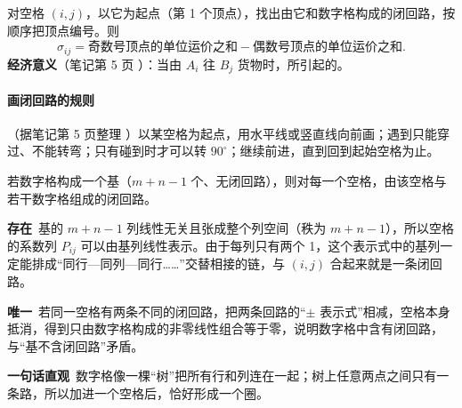 \begin{definitionbox}
对空格 $(i,j)$，以它为起点（第 1 个顶点），找出由它和数字格构成的闭回路，按顺序把顶点编号。则
\[
\sigma_{ij}=\text{奇数号顶点的单位运价之和}-\text{偶数号顶点的单位运价之和}.
\]
\textbf{经济意义}（笔记第 5 页 \orig）：当由 $A_i$ 往 $B_j$ 货物时，所引起的。
\end{definitionbox}

\paragraph{画闭回路的规则}（据笔记第 5 页整理 \orig）以某空格为起点，用水平线或竖直线向前画；遇到只能穿过、不能转弯；只有碰到时才可以转 $90^\circ$；继续前进，直到回到起始空格为止。

\begin{theorembox}[闭回路的存在唯一性]
若数字格构成一个基（$m+n-1$ 个、无闭回路），则对每一个空格，由该空格与若干数字格组成的闭回路。
\end{theorembox}
\begin{supplementbox}
\textbf{存在}\ 基的 $m+n-1$ 列线性无关且张成整个列空间（秩为 $m+n-1$），所以空格的系数列 $P_{ij}$ 可以由基列线性表示。由于每列只有两个 1，这个表示式中的基列一定能排成“同行—同列—同行……”交替相接的链，与 $(i,j)$ 合起来就是一条闭回路。\par
\textbf{唯一}\ 若同一空格有两条不同的闭回路，把两条回路的“$\pm$ 表示式”相减，空格本身抵消，得到只由数字格构成的非零线性组合等于零，说明数字格中含有闭回路，与“基不含闭回路”矛盾。\par
\textbf{一句话直观}\ 数字格像一棵“树”把所有行和列连在一起；树上任意两点之间只有一条路，所以加进一个空格后，恰好形成一个圈。
\end{supplementbox}

